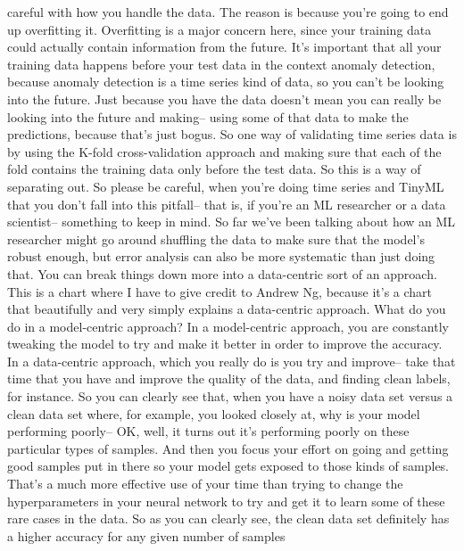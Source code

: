 {{    careful with how you handle the data.
    The reason is because you're going to end up overfitting it.
    Overfitting is a major concern here, since your training data could actually
    contain information from the future.
    It's important that all your training data
    happens before your test data in the context anomaly detection,
    because anomaly detection is a time series kind of data,
    so you can't be looking into the future.
    Just because you have the data doesn't mean
    you can really be looking into the future and making--
    using some of that data to make the predictions, because that's just bogus.
    So one way of validating time series data
    is by using the K-fold cross-validation approach
    and making sure that each of the fold contains the training data only
    before the test data.
    So this is a way of separating out.
    So please be careful, when you're doing time series and TinyML
    that you don't fall into this pitfall--
    that is, if you're an ML researcher or a data scientist-- something
    to keep in mind.
    So far we've been talking about how an ML researcher might
    go around shuffling the data to make sure that the model's robust enough,
    but error analysis can also be more systematic than just doing that.
    You can break things down more into a data-centric sort of an approach.
    This is a chart where I have to give credit to Andrew Ng,
    because it's a chart that beautifully and very simply
    explains a data-centric approach.
    What do you do in a model-centric approach?
    In a model-centric approach, you are constantly
    tweaking the model to try and make it better
    in order to improve the accuracy.
    In a data-centric approach, which you really do is you try and improve--
    take that time that you have and improve the quality of the data,
    and finding clean labels, for instance.
    So you can clearly see that, when you have a noisy data
    set versus a clean data set where, for example, you looked closely at,
    why is your model performing poorly--
    OK, well, it turns out it's performing poorly
    on these particular types of samples.
    And then you focus your effort on going and getting
    good samples put in there so your model gets exposed to those kinds of samples.
    That's a much more effective use of your time
    than trying to change the hyperparameters in your neural network
    to try and get it to learn some of these rare cases in the data.
    So as you can clearly see, the clean data set
    definitely has a higher accuracy for any given number of samples
}}
